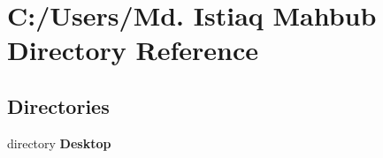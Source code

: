 \section{C\+:/\+Users/\+Md. Istiaq Mahbub Directory Reference}
\label{dir_6a616de09a4b51c41a67326e95cfd1e1}
\subsection*{Directories}
\begin{DoxyCompactItemize}
\item 
directory \textbf{ Desktop}
\end{DoxyCompactItemize}
